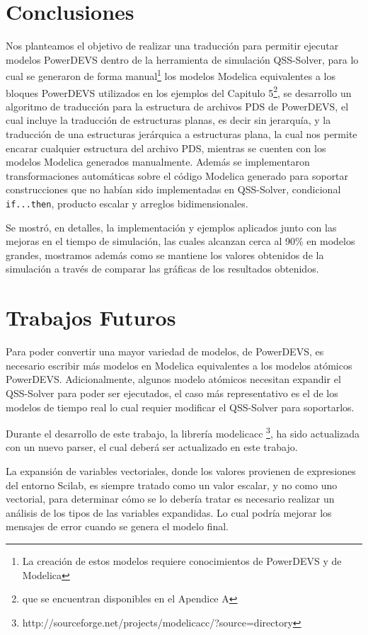 
\section{Conclusiones}

	Nos planteamos el objetivo de realizar una traducción para permitir ejecutar modelos PowerDEVS dentro de la herramienta de simulación QSS-Solver, 
	para lo cual se generaron de forma manual\footnote{La creación de estos modelos requiere conocimientos de PowerDEVS y de Modelica} los modelos 
	Modelica equivalentes a los bloques PowerDEVS utilizados en los ejemplos del Capitulo 5\footnote{que se encuentran disponibles en el Apendice A},
        se desarrollo un algoritmo de traducción para la estructura de archivos PDS de PowerDEVS, el cual incluye la traducción de estructuras planas,
	 es decir sin jerarquía, y la traducción de una estructuras jerárquica a estructuras plana, la cual nos permite encarar cualquier estructura 
	del archivo PDS, mientras se cuenten con los modelos Modelica generados manualmente. Además se implementaron transformaciones automáticas 
	sobre el código Modelica generado para soportar construcciones que no habían sido implementadas en QSS-Solver, condicional \texttt{if...then}, 
	producto escalar y arreglos bidimensionales.

	Se mostró, en detalles, la implementación y ejemplos aplicados junto con las mejoras en el tiempo de simulación, las cuales alcanzan cerca al 90\%
	 en modelos grandes, mostramos además como se mantiene los valores obtenidos de la simulación a través de comparar las gráficas de los resultados obtenidos.

\section{Trabajos Futuros}
	Para poder convertir una mayor variedad de modelos, de PowerDEVS, es necesario escribir más modelos en Modelica equivalentes a los modelos atómicos PowerDEVS.
	Adicionalmente, algunos modelo atómicos necesitan expandir el QSS-Solver para poder ser ejecutados, el caso más representativo es el de los modelos de tiempo
	 real lo cual requier modificar el QSS-Solver para soportarlos.

	Durante el desarrollo de este trabajo, la librería modelicacc \footnote{http://sourceforge.net/projects/modelicacc/?source=directory}, ha sido actualizada 
	con un nuevo parser, el cual deberá ser actualizado en este trabajo.

	La expansión de variables vectoriales, donde los valores provienen de expresiones del entorno Scilab, es siempre tratado como un valor escalar, y no como 
	uno vectorial, para determinar cómo se lo debería tratar es necesario realizar un análisis de los tipos de las variables expandidas. 
	Lo cual podría mejorar los mensajes de error cuando se genera el modelo final.

